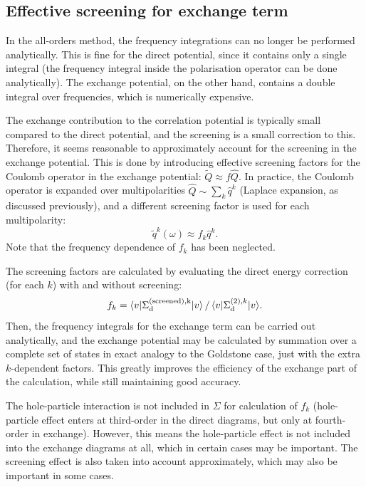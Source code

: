 \documentclass[10pt,twocolumn,a4paper]{article}%
\newcommand{\bra}[1]{\ensuremath{\langle #1|}}	%
\newcommand{\ket}[1]{\ensuremath{|#1\rangle}}	%
\newcommand{\be}{\begin{equation}}
\newcommand{\ee}{\end{equation}}
\newcommand{\w}{\ensuremath{\omega}}
\begin{document}
\subsection{Effective screening for exchange term}\label{sec:AllOrder-effectiveScreening}


In the all-orders method, the frequency integrations can no longer be performed analytically.
This is fine for the direct potential, since it contains only a single integral (the frequency integral inside the polarisation operator can be done analytically).
The exchange potential, on the other hand, contains a double integral over frequencies, which is numerically expensive.

The exchange contribution to the correlation potential is typically small compared to the direct potential, and the screening is a small correction to this.
Therefore, it seems reasonable to approximately account for the screening in the exchange potential.
This is done by introducing effective screening factors for the Coulomb operator in the exchange potential: $\widetilde Q\approx f\hat Q$.
%
In practice, the Coulomb operator is expanded over multipolarities $\hat Q\sim\sum_k \hat q^k$ (Laplace expansion, as discussed previously), and a different screening factor is used for each multipolarity:
\be
\widetilde q^k(\w)\approx f_k \hat q^k.
\ee
Note that the frequency dependence of $f_k$ has been neglected.

The screening factors are calculated by evaluating the direct energy correction (for each $k$) with and without screening:
\be
f_k = {\bra{v}\Sigma^{\rm(screened),k}_{\rm d}\ket{v} \, / \, \bra{v}\Sigma^{(2),k}_{\rm d}\ket{v}}.
\ee
Then, the frequency integrals for the exchange term can be carried out analytically, and the exchange potential may be calculated by summation over a complete set of states in exact analogy to the Goldstone case, just with the extra $k$-dependent factors.
This greatly improves the efficiency of the exchange part of the calculation, while still maintaining good accuracy.

The hole-particle interaction is not included in $\Sigma$ for calculation of $f_k$
(hole-particle effect enters at third-order in the direct diagrams, but only at fourth-order in exchange).
However, this means the hole-particle effect is not included into the exchange diagrams at all, which in certain cases may be important.
The screening effect is also taken into account approximately, which may also be important in some cases.
\end{document}

